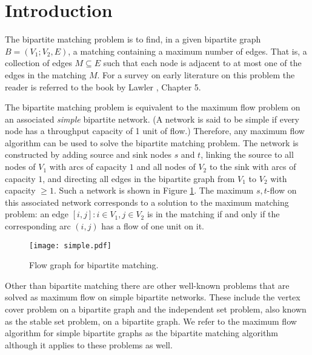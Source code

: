\documentclass{article}
\begin{document}
\section{Introduction}

The bipartite matching problem is to find, in a given bipartite graph $B=(V_1;V_2,E)$, a matching containing a maximum number of edges. That is, a collection of edges $M\subseteq E$ such that each node is adjacent to at most one of the edges in the matching $M$.  For a survey on early literature on this problem the reader is referred to the book by Lawler \cite{Law76}, Chapter 5.

The bipartite matching problem is equivalent to the maximum flow problem on an associated {\em simple} bipartite network. (A network is said to be simple if every node has a throughput capacity of 1 unit of flow.) Therefore, any maximum flow algorithm can be used to solve the bipartite matching problem. The network is constructed by adding source and sink nodes $s$ and $t$, linking the source to all nodes of $V_1$ with arcs of capacity $1$ and all nodes of $V_2$ to the sink with arcs of capacity $1$, and directing all edges in the bipartite graph from $V_1$ to $V_2$ with capacity $\geq 1$. Such a network is shown in Figure \ref{fig:simple}. The maximum $s,t$-flow on this associated network corresponds to a solution to the maximum matching problem: an edge $[i,j]: i\in V_1, j\in V_2$ is in the matching if and only if the corresponding arc $(i,j)$ has a flow of one unit on it.

\begin{figure}[ht]
\centerline{\texttt{[image: simple.pdf]}}
\caption{\label{fig:simple}Flow graph for bipartite matching.}
\end{figure}

Other than bipartite matching there are other well-known problems that are solved as maximum flow on simple bipartite networks.  These include the vertex cover problem on a bipartite graph and the independent set problem, also known as the stable set problem, on a bipartite graph. We refer to the maximum flow algorithm for simple bipartite graphs as the bipartite matching algorithm although it applies to these problems as well.
\end{document}
